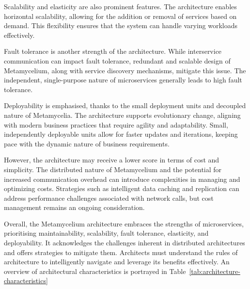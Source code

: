 \documentclass[preprint,12pt]{elsarticle}
\begin{document}
Scalability and elasticity are also prominent features. The architecture enables horizontal scalability, allowing for the addition or removal of services based on demand. This flexibility ensures that the system can handle varying workloads effectively.

Fault tolerance is another strength of the architecture. While interservice communication can impact fault tolerance, redundant and scalable design of Metamycelium, along with service discovery mechanisms, mitigate this issue. The independent, single-purpose nature of microservices generally leads to high fault tolerance.

Deployability is emphasised, thanks to the small deployment units and decoupled nature of Metamycelia. The architecture supports evolutionary change, aligning with modern business practices that require agility and adaptability. Small, independently deployable units allow for faster updates and iterations, keeping pace with the dynamic nature of business requirements.

However, the architecture may receive a lower score in terms of cost and simplicity. The distributed nature of Metamycelium and the potential for increased communication overhead can introduce complexities in managing and optimizing costs. Strategies such as intelligent data caching and replication can address performance challenges associated with network calls, but cost management remains an ongoing consideration.

Overall, the Metamycelium architecture embraces the strengths of microservices, prioritising maintainability, scalability, fault tolerance, elasticity, and deployability. It acknowledges the challenges inherent in distributed architectures and offers strategies to mitigate them. Architects must understand the rules of architecture to intelligently navigate and leverage its benefits effectively. An overview of architectural characteristics is portrayed in Table~\ref{tab:architecture-characteristics}
\end{document}
